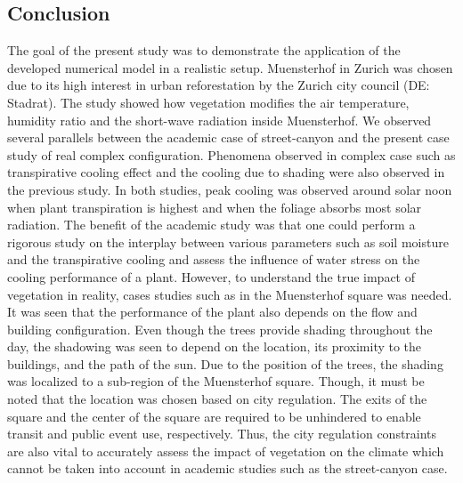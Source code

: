 \subsection{Conclusion}

The goal of the present study was to demonstrate the application of the developed numerical model in a realistic setup. Muensterhof in Zurich was chosen due to its high interest in urban reforestation by the Zurich city council (DE: Stadrat). The study showed how vegetation modifies the air temperature, humidity ratio and the short-wave radiation inside Muensterhof. We observed several parallels between the academic case of street-canyon and the present case study of real complex configuration. Phenomena observed in complex case such as transpirative cooling effect and the cooling due to shading were also observed in the previous study. In both studies, peak cooling was observed around solar noon when plant transpiration is highest and when the foliage absorbs most solar radiation. The benefit of the academic study was that one could perform a rigorous study on the interplay between various parameters such as soil moisture and the transpirative cooling and assess the influence of water stress on the cooling performance of a plant. However, to understand the true impact of vegetation in reality, cases studies such as in the Muensterhof square was needed. It was seen that the performance of the plant also depends on the flow and building configuration. Even though the trees provide shading throughout the day, the shadowing was seen to depend on the location, its proximity to the buildings, and the path of the sun. Due to the position of the trees, the shading was localized to a sub-region of the Muensterhof square. Though, it must be noted that the location was chosen based on city regulation. The exits of the square and the center of the square are required to be unhindered to enable transit and public event use, respectively. Thus, the city regulation constraints are also vital to accurately assess the impact of vegetation on the climate which cannot be taken into account in academic studies such as the street-canyon case. 


